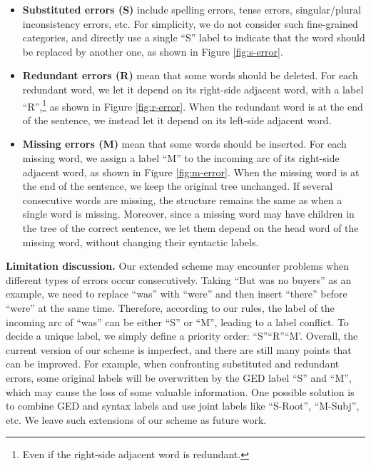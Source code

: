 \documentclass[11pt]{article}
\begin{document}
\begin{itemize}
    \item \textbf{Substituted errors (S)} include spelling errors, tense errors, singular/plural inconsistency errors, etc. For simplicity, we do not consider such fine-grained categories, and directly use a single ``S'' label to indicate that the word should be replaced by another one, as shown in Figure \ref{fig:s-error}.
    \item \textbf{Redundant errors (R)} mean that some words should be deleted. For each redundant word, we let it depend on its right-side adjacent word, with a label ``R'',\footnote{Even if the right-side adjacent word is redundant.} as shown in Figure \ref{fig:r-error}. When the redundant word is at the end of the sentence, we instead let it depend on its left-side adjacent word. 
    \item \textbf{Missing errors (M)} mean that some words should be inserted. For each missing word, we assign a label ``M'' to the incoming arc of its right-side adjacent word, as shown in Figure \ref{fig:m-error}. When the missing word is at the end of the sentence, we  keep the original tree unchanged. If several consecutive words are missing, the structure remains the same as when a single word is  missing.  Moreover, since a missing word may have children in the tree of the correct sentence, we let them depend on the head word of the missing word, without changing their  syntactic labels. 
\end{itemize}











\textbf{Limitation discussion.} Our extended scheme may 
encounter problems when different types of errors occur consecutively. Taking ``But was no buyers'' as an example, we need to replace ``was'' with ``were'' and then insert ``there'' before ``were'' at the same time. 
Therefore, according to our rules, the label of the incoming arc of ``was'' can be either ``S'' or ``M'', leading to a label conflict. 
To decide a unique label, we simply define a priority order: ``S''``R''``M'.
Overall, the current version of our scheme is imperfect, and there are still many points that can be improved. For example, when confronting substituted and redundant errors, some original labels will be overwritten by the GED label ``S'' and ``M'', which may cause the loss of some valuable information. One possible solution is to combine GED and syntax labels and use joint labels like ``S-Root'', ``M-Subj'', etc. We leave such extensions of our scheme as future work.
\end{document}
